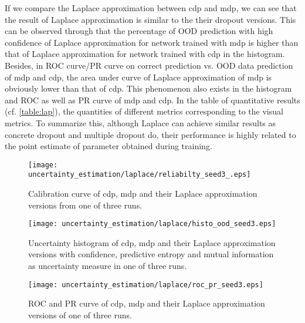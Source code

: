 If we compare the Laplace approximation between cdp and mdp, we can see that the result of Laplace approximation is similar to the their dropout versions. This can be observed through that the percentage of OOD prediction with high confidence of Laplace approximation for network trained with mdp is higher than that of Laplace approximation for network trained with cdp in the histogram. Besides, in ROC curve/PR curve on correct prediction vs. OOD data prediction of mdp and cdp, the area under curve of Laplace approximation of mdp is obviously lower than that of cdp. This phenomenon also exists in the histogram and ROC as well as PR curve of mdp and cdp. In the table of quantitative results (cf. \ref{table:lap}), the quantities of different metrics corresponding to the visual metrics. To summarize this, although Laplace can achieve similar results as concrete dropout and multiple dropout do, their performance is highly related to the point estimate of parameter obtained during training.

\begin{figure}[H]
	\begin{center}
		\texttt{[image: uncertainty\_estimation/laplace/reliabilty\_seed3\_.eps]}
		\caption{Calibration curve of cdp, mdp and their Laplace approximation versions from one of three runs.}		
		\label{lap_calibration}
	\end{center}
\end{figure}

\begin{figure}[h!]		
	\centering
	\texttt{[image: uncertainty\_estimation/laplace/histo\_ood\_seed3.eps]}
	\caption{Uncertainty histogram of cdp, mdp and their Laplace approximation versions with confidence, predictive entropy and mutual information as uncertainty measure in one of three runs.}
	\label{figure:lap_hist}	
\end{figure}


\begin{figure}[H]
	\begin{center}
		\texttt{[image: uncertainty\_estimation/laplace/roc\_pr\_seed3.eps]}
		\caption{ROC and PR curve of cdp, mdp and their Laplace approximation versions of one of three runs.}		
		\label{lap_roc_pr}
	\end{center}
\end{figure}

